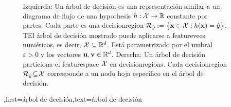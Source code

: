 {{\begin{figure}[H]
\begin{minipage}{.45\textwidth}
\end{minipage}
	\caption{Izquierda: Un árbol de decisión es una representación similar a un diagrama de flujo de una \gls{hypothesis} $h: \mathcal{X} \rightarrow \mathbb{R}$ constante por partes.  Cada parte es una \gls{decisionregion} $\mathcal{R}_{\hat{y}} := \big\{ {\bf x} \in  \mathcal{X}: h({\bf x}) = \hat{y} \big\}$. 
		TEl árbol de decisión mostrado puede aplicarse a \gls{featurevec}s numéricos, es decir, $\mathcal{X} \subseteq \mathbb{R}^{d}$. Está parametrizado por el umbral $\varepsilon>0$ y los vectores ${\bf u}, {\bf v} \in \mathbb{R}^{d}$. 
		Derecha: Un árbol de decisión particiona
		el \gls{featurespace} $\mathcal{X}$ en \gls{decisionregion}s. Cada \gls{decisionregion}  
		$\mathcal{R}_{\hat{y}} \!\subseteq\!\mathcal{X}$ corresponde a un nodo hoja específico en el árbol de decisión.}
	\label{fig_decision_tree}
\end{figure} 
	  }
	  ,first={árbol de decisión},text={árbol de decisión} }



